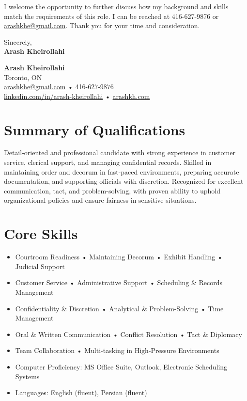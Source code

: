 \documentclass[letterpaper,10pt]{article}
\begin{document}
I welcome the opportunity to further discuss how my background and skills match the requirements of this role. I can be reached at 416-627-9876 or \href{mailto:arashkhe@gmail.com}{arashkhe@gmail.com}. Thank you for your time and consideration.

\vspace{2em}
Sincerely,\\[2em]

\textbf{Arash Kheirollahi}

\newpage


{\LARGE \textbf{Arash Kheirollahi}}\\[0.2em]
Toronto, ON \\
\href{mailto:arashkhe@gmail.com}{arashkhe@gmail.com} • 416-627-9876 \\
\href{https://linkedin.com/in/arash-kheirollahi}{linkedin.com/in/arash-kheirollahi} • \href{https://www.arashkh.com}{arashkh.com}

\vspace{0.8em}

\section*{Summary of Qualifications}
Detail-oriented and professional candidate with strong experience in customer service, clerical support, and managing confidential records. Skilled in maintaining order and decorum in fast-paced environments, preparing accurate documentation, and supporting officials with discretion. Recognized for excellent communication, tact, and problem-solving, with proven ability to uphold organizational policies and ensure fairness in sensitive situations.

\section*{Core Skills}
\begin{itemize}[leftmargin=*]
  \item Courtroom Readiness • Maintaining Decorum • Exhibit Handling • Judicial Support
  \item Customer Service • Administrative Support • Scheduling \& Records Management
  \item Confidentiality \& Discretion • Analytical \& Problem-Solving • Time Management
  \item Oral \& Written Communication • Conflict Resolution • Tact \& Diplomacy
  \item Team Collaboration • Multi-tasking in High-Pressure Environments
  \item Computer Proficiency: MS Office Suite, Outlook, Electronic Scheduling Systems
  \item Languages: English (fluent), Persian (fluent)
\end{itemize}
\end{document}
